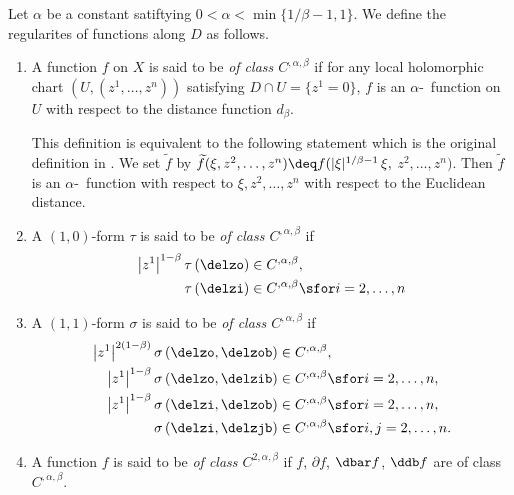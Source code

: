 \documentclass[12pt]{amsart}
\begin{document}
\begin{definition}\label{Donaldson}
Let $\alpha $ be a constant satiftying $0< \alpha < \min\{ 1/\beta -1, 1  \}$. We define the regularites of functions along $D$ as follows. 
\begin{enumerate}
	\item A function $f$ on $X$ is said to be {\it of class $C^{,\alpha ,\beta}$} if for any local holomorphic chart $(U, (z^1, \dots, z^n))$ satisfying $D\cap U =\{ z^1 =0 \}$, 
	$f$ is  an $\alpha$-\holder \ function on $U$ with respect to the distance function $d_\beta $.
	
	This definition is equivalent to the following statement which is the original definition in \citep{Donaldson12KametricConesing}. We set $\widetilde{f}$ by $\widetilde{f}(\xi , z^2, \dots, z^n) \deq f ( |\xi |^{1/\beta -1}\, \xi ,$ $z^2, \dots, z^n)$. Then $\widetilde{f}$ is an $\alpha$-\holder \ function with respect to $\xi , z^2, \dots, z^n$ with respect to the Euclidean distance.
	\item A $(1, 0)$-form $\tau $ is said to be {\it of class $C^{,\alpha ,\beta}$} if 
				\begin{align*}
					\left| z^{1} \right| ^{1-\beta} \tau \left(  \delzo  \right) & \in C^{,\alpha ,\beta}, \\
					\tau \left( \delzi   \right) &  \in C^{,\alpha ,\beta} \sfor i=2, \dots, n
				\end{align*}
	\item A $(1,1)$-form $\sigma $ is said to be {\it of class $C^{,\alpha ,\beta}$} if 
				\begin{align*}
					\left| z^{1} \right| ^{2(1-\beta)} \sigma \left(  \delzo,  \delzob   \right) &  \in C^{,\alpha ,\beta}, \\
					\left| z^{1} \right| ^{1-\beta} \sigma \left( \delzo,  \delzib  \right) &  \in C^{,\alpha ,\beta} \sfor i=2, \dots, n, \\
					\left| z^{1} \right| ^{1-\beta} \sigma \left( \delzi,  \delzob  \right) &  \in C^{,\alpha ,\beta} \sfor i=2, \dots, n, \\
					\sigma \left( \delzi,  \delzjb  \right) &  \in C^{,\alpha ,\beta} \sfor i,j=2, \dots, n.
				\end{align*}
	\item A function $f$ is said to be {\it of class $C^{2,\alpha ,\beta}$} if $f$, $\partial f$, $\dbar f$, $\ddb f$ are of class $C^{,\alpha ,\beta}$.
\end{enumerate}
\end{definition}
\vspace{10pt}
\end{document}
